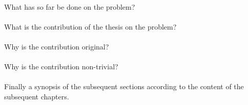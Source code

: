 \paragraph{}	What has so far be done on the problem?
\paragraph{}	What is the contribution of the thesis on the problem?
\paragraph{}	Why is the contribution original?
\paragraph{}	Why is the contribution non-trivial?
\paragraph{}Finally a synopsis of the subsequent sections according to the content of the subsequent chapters.
